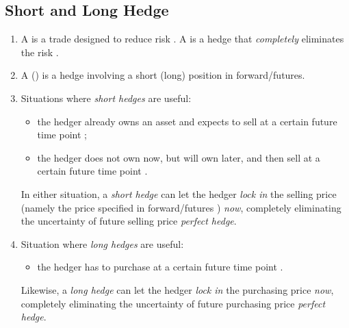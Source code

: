 \subsection{Short and Long Hedge}
\begin{enumerate}
\item A   is a trade designed to reduce risk . A
 is a hedge that \emph{completely} eliminates the risk
.
\item A  () is a hedge involving a short
(long) position in forward/futures.
\item Situations where \emph{short hedges} are useful:
\begin{itemize}
\item the hedger already owns an asset  and expects to sell
 at a certain future time point ;
\item the hedger does not own  now, but will own
 later, and then sell  at a certain future time
point .
\end{itemize}
In either situation, a \emph{short hedge} can let the hedger \emph{lock in}
 the selling price  (namely the price specified
in forward/futures ) \emph{now}, completely eliminating the
uncertainty of future selling price  \emph{perfect hedge}.

\item Situation where \emph{long hedges} are useful:
\begin{itemize}
\item the hedger has to purchase  at a certain future time
point .
\end{itemize}
Likewise, a \emph{long hedge} can let the hedger \emph{lock in}
 the purchasing price  \emph{now}, completely
eliminating the uncertainty of future purchasing price 
\emph{perfect hedge}.
\end{enumerate}
